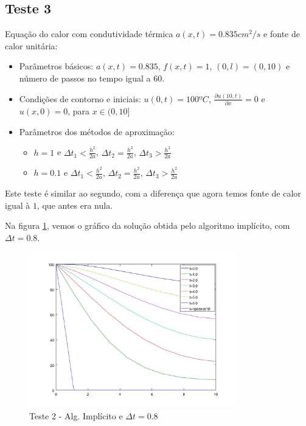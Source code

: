 \documentclass[
	11pt,				%
	oneside,			%
	a4paper,			%
	english,			%
	brazil,				%
	]{article}
\begin{document}
\subsection{Teste 3}
Equação do calor com condutividade térmica $a(x,t) = 0.835 cm^2/s$ e fonte de 
calor unitária:

\begin{itemize}
 \item Parâmetros básicos:
 $a(x,t) = 0.835$, $f(x,t) = 1$, $(0,l) = (0,10)$ e número de passos no tempo 
igual a 60.
 \item Condições de contorno e iniciais:
 $u(0,t) = 100ºC$, $\frac{\partial u(10,t)}{\partial x} = 0$ e 
$u(x,0) = 0$, para $x \in (0,10]$
 \item Parâmetros dos métodos de aproximação:
 \begin{itemize}
  \item $h = 1$ e $\Delta t_1 < \frac{h^2}{2a}$, $\Delta t_2 = 
\frac{h^2}{2a}$, $\Delta t_3 > \frac{h^2}{2a}$
  \item $h = 0.1$ e $\Delta t_1 < \frac{h^2}{2a}$, $\Delta t_2 = 
\frac{h^2}{2a}$, $\Delta t_3 > \frac{h^2}{2a}$
 \end{itemize}
\end{itemize}

Este teste é similar ao segundo, com a diferença que agora temos fonte de 
calor igual à $1$, que antes era nula.

Na figura \ref{fig:t3-imp}, vemos o gráfico da solução obtida pelo 
algoritmo implícito, com $\Delta t = 0.8$.

\begin{figure}[ht]
    \centering
    \includegraphics[width=0.8\textwidth]{teste3-imp-dt-08}
    \caption{Teste 2 - Alg. Implícito e $\Delta t = 0.8$}
    \label{fig:t3-imp}
\end{figure}
\end{document}
